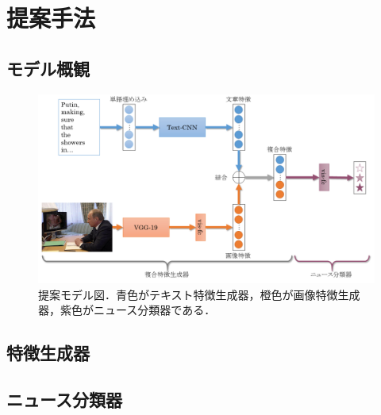 %
\chapter{提案手法}
%
\section{モデル概観}
% 
\begin{figure}
    \centering
    \includegraphics[width=\linewidth]{images/methodology.png}
    \caption{提案モデル図．青色がテキスト特徴生成器，橙色が画像特徴生成器，紫色がニュース分類器である．}
    \label{fig:model}
\end{figure}

%
\section{特徴生成器}
%

%
\section{ニュース分類器}
%




%
%
\newpage
%
%
%
%
%
%
%
%
%
%
% 